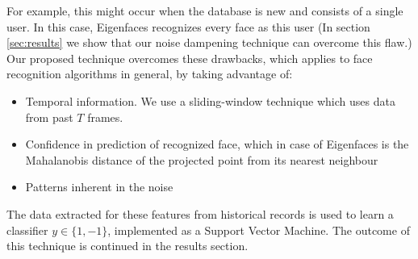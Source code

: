 \documentclass[%
        final,
        internal,
        notitlepage,
        narroweqnarray,
        inline,
        ]{ieee}
\begin{document}
For example, this might occur when the database is new and consists of a single user. 
In this case, Eigenfaces recognizes every face as this user 
(In section \ref{sec:results} we show that our noise dampening technique can overcome this flaw.)
Our proposed technique overcomes these drawbacks, which applies to face recognition algorithms in general, by taking advantage of:
\begin{itemize}
	\item Temporal information. We use a sliding-window technique which uses data from past $T$ frames.
	\item Confidence in prediction of recognized face, which in case of Eigenfaces is the Mahalanobis distance of the projected point from its nearest neighbour
	\item Patterns inherent in the noise
\end{itemize}
The data extracted for these features from historical records is used to learn a classifier $y \in \{1,-1\}$, implemented as a Support Vector Machine. The outcome of this technique is continued in the results section.
\end{document}
